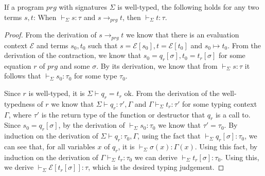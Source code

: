 \begin{lemma}
If a program $prg$ with signatures $\Sigma$ is well-typed, the following holds for any two terms $s, t$: When $\vdash_{\Sigma} s : \tau$ and $s \longrightarrow_{prg} t$, then $\vdash_{\Sigma} t : \tau$.
\begin{proof}
From the derivation of $s \longrightarrow_{prg} t$ we know that there is an evaluation context $\mathcal{E}$ and terms $s_0, t_0$ such that $s = \mathcal{E}[s_0], t = \mathcal{E}[t_0]$ and $s_0 \mapsto t_0$. From the derivation of the contraction, we know that $s_0 = q_r[\sigma], t_0 = t_r[\sigma]$ for some equation $r$ of $prg$ and some $\sigma$.  By its derivation, we know that from $\vdash_{\Sigma} s : \tau$ it follows that $\vdash_{\Sigma} s_0 : \tau_0$ for some type $\tau_0$.


Since $r$ is well-typed, it is $\Sigma \vdash q_r = t_r \textrm{ ok}$. From the derivation of the well-typedness of $r$ we know that $\Sigma \vdash q_r : \tau', \Gamma$ and $\Gamma \vdash_{\Sigma} t_r : \tau'$ for some typing context $\Gamma$, where $\tau'$ is the return type of the function or destructor that $q_r$ is a call to. Since $s_0 = q_r[\sigma]$, by the derivation of $\vdash_{\Sigma} s_0 : \tau_0$ we know that $\tau' = \tau_0$. By induction on the derivation of $\Sigma \vdash q_r : \tau_0, \Gamma$, using the fact that $\vdash_{\Sigma} q_r[\sigma] : \tau_0$, we can see that, for all variables $x$ of $q_r$, it is $\vdash_{\Sigma} \sigma(x) : \Gamma(x)$. Using this fact, by induction on the derivation of $\Gamma \vdash_{\Sigma} t_r : \tau_0$ we can derive $\vdash_{\Sigma} t_r[\sigma] : \tau_0$. Using this, we derive $\vdash_{\Sigma} \mathcal{E}[t_r[\sigma]] : \tau$, which is the desired typing judgement.
\end{proof}
\end{lemma}

